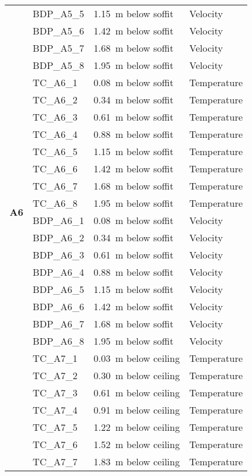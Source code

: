 \begin{longtable}[c]{c|lll}
 & BDP\_A5\_5 & 1.15~m below soffit  & Velocity \\
 & BDP\_A5\_6 & 1.42~m below soffit  & Velocity \\
 & BDP\_A5\_7 & 1.68~m below soffit  & Velocity \\
 & BDP\_A5\_8 & 1.95~m below soffit  & Velocity \\
\midrule
\multirow{16}{*}{\large{\textbf{A6}}}
 & TC\_A6\_1  & 0.08~m below soffit  & Temperature \\
 & TC\_A6\_2  & 0.34~m below soffit  & Temperature \\
 & TC\_A6\_3  & 0.61~m below soffit  & Temperature \\
 & TC\_A6\_4  & 0.88~m below soffit  & Temperature \\
 & TC\_A6\_5  & 1.15~m below soffit  & Temperature \\
 & TC\_A6\_6  & 1.42~m below soffit  & Temperature \\
 & TC\_A6\_7  & 1.68~m below soffit  & Temperature \\
 & TC\_A6\_8  & 1.95~m below soffit  & Temperature \\
\cline{2-4}
 & BDP\_A6\_1 & 0.08~m below soffit  & Velocity \\
 & BDP\_A6\_2 & 0.34~m below soffit  & Velocity \\
 & BDP\_A6\_3 & 0.61~m below soffit  & Velocity \\
 & BDP\_A6\_4 & 0.88~m below soffit  & Velocity \\
 & BDP\_A6\_5 & 1.15~m below soffit  & Velocity \\
 & BDP\_A6\_6 & 1.42~m below soffit  & Velocity \\
 & BDP\_A6\_7 & 1.68~m below soffit  & Velocity \\
 & BDP\_A6\_8 & 1.95~m below soffit  & Velocity \\
\bottomrule
\newpage
\multirow{8}{*}{\large{\textbf{A7}}}
 & TC\_A7\_1  & 0.03~m below ceiling & Temperature \\
 & TC\_A7\_2  & 0.30~m below ceiling & Temperature \\
 & TC\_A7\_3  & 0.61~m below ceiling & Temperature \\
 & TC\_A7\_4  & 0.91~m below ceiling & Temperature \\
 & TC\_A7\_5  & 1.22~m below ceiling & Temperature \\
 & TC\_A7\_6  & 1.52~m below ceiling & Temperature \\
 & TC\_A7\_7  & 1.83~m below ceiling & Temperature \\

\end{longtable}
